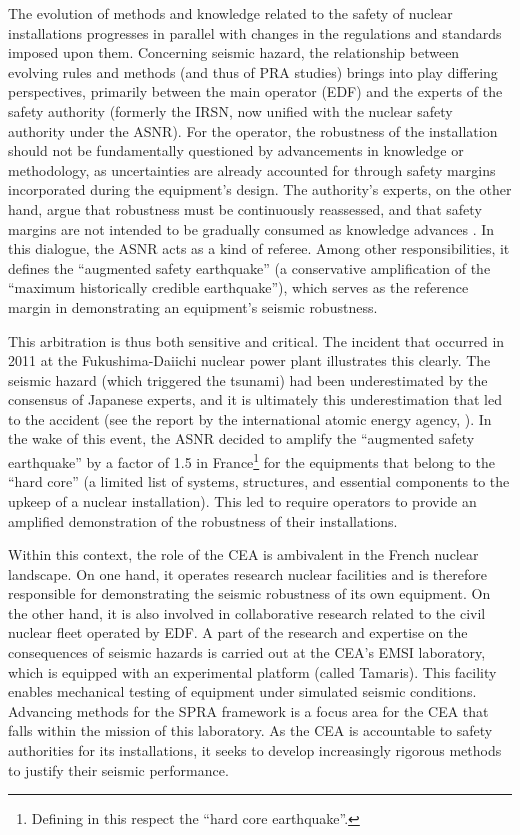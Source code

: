 The evolution of methods and knowledge related to the safety of nuclear installations progresses in parallel with changes in the regulations and standards imposed upon them. Concerning seismic hazard, the relationship between evolving rules and methods (and thus of PRA studies) brings into play differing perspectives, primarily between the main operator (EDF) and the experts of the safety authority (formerly the IRSN, now unified with the nuclear safety authority under the ASNR).
For the operator, the robustness of the installation should not be fundamentally questioned by advancements in knowledge or methodology, as uncertainties are already accounted for through safety margins incorporated during the equipment’s design. The authority’s experts, on the other hand, argue that robustness must be continuously reassessed, and that safety margins are not intended to be gradually consumed as knowledge advances \citep{roger_seisme_2020}. %
In this dialogue, the ASNR acts as a kind of referee. Among other responsibilities, it defines the ``augmented safety earthquake'' (a conservative amplification of the ``maximum historically credible earthquake''), which serves as the reference margin in demonstrating an equipment's seismic robustness.



This arbitration is thus both sensitive and critical.
The incident that occurred in 2011 at the Fukushima-Daiichi nuclear power plant illustrates this clearly. The seismic hazard (which triggered the tsunami) had been underestimated by the consensus of Japanese experts, and it is ultimately this underestimation that led to the accident (see the report by the international atomic energy agency, \cite{iaea_fukushima_2015}). In the wake of this event,
 the ASNR decided to amplify the ``augmented safety earthquake'' by a factor of 1.5 in France\footnote{Defining in this respect the ``hard core earthquake''.}
 for the equipments that belong to the ``hard core'' (a limited list of systems, structures, and essential components to the upkeep of a nuclear installation).
 This led to require operators to provide an amplified demonstration of the robustness of their installations.

Within this context, the role of the CEA is ambivalent in the French nuclear landscape. On one hand, it operates research nuclear facilities and is therefore responsible for demonstrating the seismic robustness of its own equipment. On the other hand, it is also involved in collaborative research related to the civil nuclear fleet operated by EDF. A part of the research and expertise on the consequences of seismic hazards is carried out at the CEA’s EMSI laboratory, which is equipped with an experimental platform (called Tamaris). This facility enables mechanical testing of equipment under simulated seismic conditions.
Advancing methods for the SPRA framework is a focus area for the CEA that falls within the mission of this laboratory. As the CEA is accountable to safety authorities for its installations, it seeks to develop increasingly rigorous methods to justify their seismic performance.

